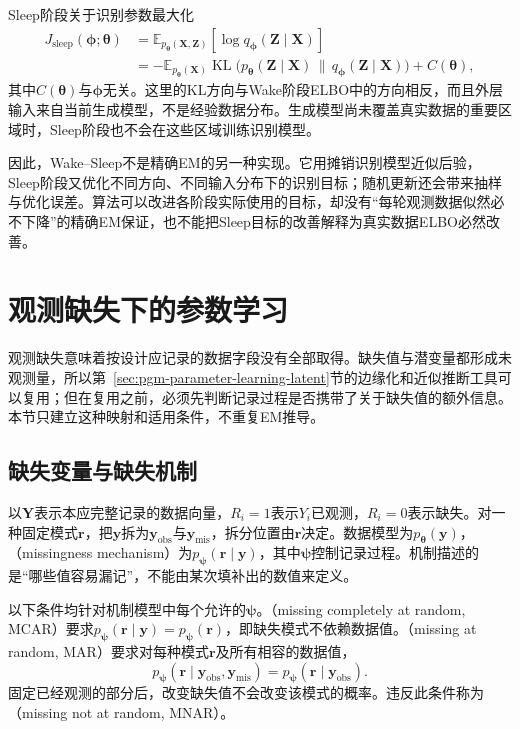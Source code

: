 Sleep阶段关于识别参数最大化
\begin{equation}
  \begin{aligned}
    J_{\mathrm{sleep}}(\bm{\phi};\bm{\theta})
      &=\mathbb{E}_{p_{\bm{\theta}}(\bm{X},\bm{Z})}
          [\log q_{\bm{\phi}}(\bm{Z}\mid\bm{X})]\\
      &=-\mathbb{E}_{p_{\bm{\theta}}(\bm{X})}
          \operatorname{KL}\bigl(
            p_{\bm{\theta}}(\bm{Z}\mid\bm{X})
            \,\|\,q_{\bm{\phi}}(\bm{Z}\mid\bm{X})\bigr)+C(\bm{\theta}),
  \end{aligned}
  \label{eq:pgm-parameter-learning-sleep-objective}
\end{equation}
其中$C(\bm{\theta})$与$\bm{\phi}$无关。这里的KL方向与Wake阶段ELBO中的方向相反，而且外层输入来自当前生成模型，不是经验数据分布。生成模型尚未覆盖真实数据的重要区域时，Sleep阶段也不会在这些区域训练识别模型。

因此，Wake--Sleep不是精确EM的另一种实现。它用摊销识别模型近似后验，Sleep阶段又优化不同方向、不同输入分布下的识别目标；随机更新还会带来抽样与优化误差。算法可以改进各阶段实际使用的目标，却没有“每轮观测数据似然必不下降”的精确EM保证，也不能把Sleep目标的改善解释为真实数据ELBO必然改善。

\section{观测缺失下的参数学习}
\label{sec:pgm-parameter-learning-incomplete}

观测缺失意味着按设计应记录的数据字段没有全部取得。缺失值与潜变量都形成未观测量，所以第~\ref{sec:pgm-parameter-learning-latent}节的边缘化和近似推断工具可以复用；但在复用之前，必须先判断记录过程是否携带了关于缺失值的额外信息。本节只建立这种映射和适用条件，不重复EM推导。

\subsection{缺失变量与缺失机制}
\label{sec:pgm-parameter-learning-missingness}

以$\bm{Y}$表示本应完整记录的数据向量，$R_i=1$表示$Y_i$已观测，$R_i=0$表示缺失。对一种固定模式$\bm{r}$，把$\bm{y}$拆为$\bm{y}_{\mathrm{obs}}$与$\bm{y}_{\mathrm{mis}}$，拆分位置由$\bm{r}$决定。数据模型为$p_{\bm{\theta}}(\bm{y})$，（missingness mechanism）为$p_{\bm{\psi}}(\bm{r}\mid\bm{y})$，其中$\bm{\psi}$控制记录过程。机制描述的是“哪些值容易漏记”，不能由某次填补出的数值来定义。

\begin{definition}[缺失机制]
  \label{def:pgm-parameter-learning-missingness}
  以下条件均针对机制模型中每个允许的$\bm{\psi}$。（missing completely at random, MCAR）要求$p_{\bm{\psi}}(\bm{r}\mid\bm{y})=p_{\bm{\psi}}(\bm{r})$，即缺失模式不依赖数据值。（missing at random, MAR）要求对每种模式$\bm{r}$及所有相容的数据值，
  \[
    p_{\bm{\psi}}(\bm{r}\mid
        \bm{y}_{\mathrm{obs}},\bm{y}_{\mathrm{mis}})
    =p_{\bm{\psi}}(\bm{r}\mid\bm{y}_{\mathrm{obs}}).
  \]
  固定已经观测的部分后，改变缺失值不会改变该模式的概率。违反此条件称为（missing not at random, MNAR）。
\end{definition}

